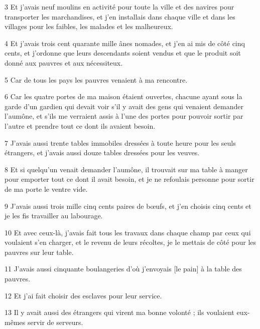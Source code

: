 \par 3 Et j'avais neuf moulins en activité pour toute la ville et des navires pour transporter les marchandises, et j'en installais dans chaque ville et dans les villages pour les faibles, les malades et les malheureux.

\par 4 Et j'avais trois cent quarante mille ânes nomades, et j'en ai mis de côté cinq cents, et j'ordonne que leurs descendants soient vendus et que le produit soit donné aux pauvres et aux nécessiteux.

\par 5 Car de tous les pays les pauvres venaient à ma rencontre.

\par 6 Car les quatre portes de ma maison étaient ouvertes, chacune ayant sous la garde d'un gardien qui devait voir s'il y avait des gens qui venaient demander l'aumône, et s'ils me verraient assis à l'une des portes pour pouvoir sortir par l'autre et prendre tout ce dont ils avaient besoin.

\par 7 J'avais aussi trente tables immobiles dressées à toute heure pour les seuls étrangers, et j'avais aussi douze tables dressées pour les veuves.

\par 8 Et si quelqu'un venait demander l'aumône, il trouvait sur ma table à manger pour emporter tout ce dont il avait besoin, et je ne refoulais personne pour sortir de ma porte le ventre vide.

\par 9 J'avais aussi trois mille cinq cents paires de bœufs, et j'en choisis cinq cents et je les fis travailler au labourage.

\par 10 Et avec ceux-là, j'avais fait tous les travaux dans chaque champ par ceux qui voulaient s'en charger, et le revenu de leurs récoltes, je le mettais de côté pour les pauvres sur leur table.

\par 11 J'avais aussi cinquante boulangeries d'où j'envoyais [le pain] à la table des pauvres.

\par 12 Et j'ai fait choisir des esclaves pour leur service.

\par 13 Il y avait aussi des étrangers qui virent ma bonne volonté ; ils voulaient eux-mêmes servir de serveurs.

